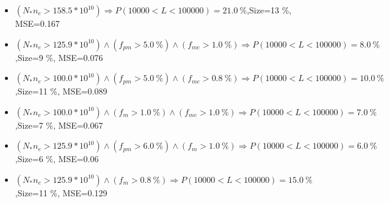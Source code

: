 \documentclass[numbered]{CSL}
\begin{document}
\begin{itemize}
\item $(N_* n_e > 158.5 * 10^{10}) \Rightarrow P(10 000 < L < 100 000) = 21.0~\%$,\hfill Size=13 \%, MSE=0.167
\item $(N_* n_e > 125.9 * 10^{10}) \land (f_{pm} > 5.0~\%) \land (f_{me} > 1.0~\%) \Rightarrow P(10 000 < L < 100 000) = 8.0~\%$,\hfill Size=9 \%, MSE=0.076
\item $(N_* n_e > 100.0 * 10^{10}) \land (f_{pm} > 5.0~\%) \land (f_{me} > 0.8~\%) \Rightarrow P(10 000 < L < 100 000) = 10.0~\%$,\hfill Size=11 \%, MSE=0.089
\item $(N_* n_e > 100.0 * 10^{10}) \land (f_m > 1.0~\%) \land (f_{me} > 1.0~\%) \Rightarrow P(10 000 < L < 100 000) = 7.0~\%$,\hfill Size=7 \%, MSE=0.067
\item $(N_* n_e > 125.9 * 10^{10}) \land (f_{pm} > 6.0~\%) \land (f_m > 1.0~\%) \Rightarrow P(10 000 < L < 100 000) = 6.0~\%$,\hfill Size=6 \%, MSE=0.06
\item $(N_* n_e > 125.9 * 10^{10}) \land (f_m > 0.8~\%) \Rightarrow P(10 000 < L < 100 000) = 15.0~\%$,\hfill Size=11 \%, MSE=0.129
\end{itemize}
\end{document}
